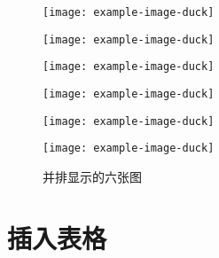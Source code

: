 \documentclass{QHUMaster}
\begin{document}
\begin{figure}[htbp]
	\centering
	\begin{minipage}[b]{0.3\textwidth}
		\centering
		\texttt{[image: example-image-duck]}
		\label{fig:subfig1}
	\end{minipage}
	\hfill
	\begin{minipage}[b]{0.3\textwidth}
		\centering
		\texttt{[image: example-image-duck]}
		\label{fig:subfig2}
	\end{minipage}
	\hfill
	\begin{minipage}[b]{0.3\textwidth}
		\centering
		\texttt{[image: example-image-duck]}
		\label{fig:subfig3}
	\end{minipage}
	\vspace{0.5cm}
	\begin{minipage}[b]{0.3\textwidth}
		\centering
		\texttt{[image: example-image-duck]}
		\label{fig:subfig4}
	\end{minipage}
	\hfill
	\begin{minipage}[b]{0.3\textwidth}
		\centering
		\texttt{[image: example-image-duck]}
		\label{fig:subfig5}
	\end{minipage}
	\hfill
	\begin{minipage}[b]{0.3\textwidth}
		\centering
		\texttt{[image: example-image-duck]}
		\label{fig:subfig6}
	\end{minipage}
	\caption{并排显示的六张图}
	\label{fig:main}
\end{figure}

\section{插入表格}
\zhlipsum[1]
\end{document}
